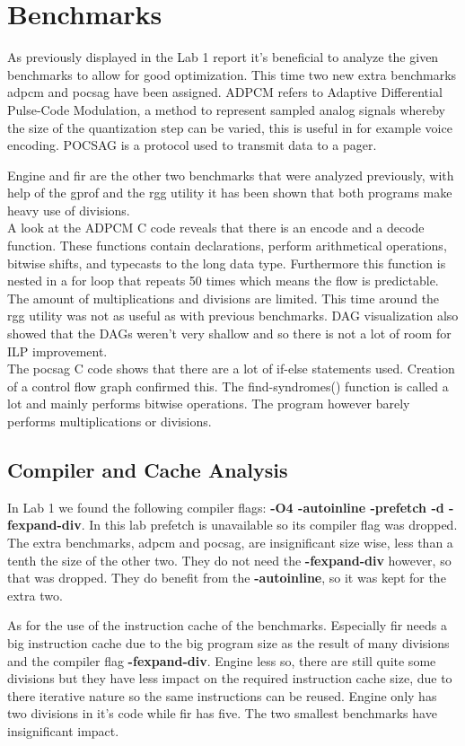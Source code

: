\section{Benchmarks}
\label{sec:benchmarks}
As previously displayed in the Lab 1 report it's beneficial to analyze the given benchmarks to allow for good optimization.
This time two new extra benchmarks adpcm and pocsag have been assigned.
ADPCM refers to Adaptive Differential Pulse-Code Modulation, a method to represent sampled analog signals whereby the size of the quantization step can be varied, this is useful in for example voice encoding.
POCSAG is a protocol used to transmit data to a pager.


Engine and fir are the other two benchmarks that were analyzed previously, with help of the gprof and the rgg utility it has been shown that both programs make heavy use of divisions.\\
A look at the ADPCM C code reveals that there is an encode and a decode function. 
These functions contain declarations, perform arithmetical operations, bitwise shifts, and typecasts to the long data type. 
Furthermore this function is nested in a for loop that repeats 50 times which means the flow is predictable. 
The amount of multiplications and divisions are limited. 
This time around the rgg utility was not as useful as with previous benchmarks. 
DAG visualization also showed that the DAGs weren't very shallow and so there is not a lot of room for ILP improvement.\\
The pocsag C code shows that there are a lot of if-else statements used. 
Creation of a control flow graph confirmed this.
The find-syndromes() function is called a lot and mainly performs bitwise operations. 
The program however barely performs multiplications or divisions.

\subsection{Compiler and Cache Analysis}
\label{ssec:benchmarks-analysis}
In Lab 1 we found the following compiler flags: \textbf{-O4 -autoinline -prefetch -d -fexpand-div}.
In this lab prefetch is unavailable so its compiler flag was dropped.
The extra benchmarks, adpcm and pocsag, are insignificant size wise, less than a tenth the size of the other two.
They do not need the \textbf{-fexpand-div} however, so that was dropped.
They do benefit from the \textbf{-autoinline}, so it was kept for the extra two.

As for the use of the instruction cache of the benchmarks.
Especially fir needs a big instruction cache due to the big program size as the result of many divisions and the compiler flag \textbf{-fexpand-div}.
Engine less so, there are still quite some divisions but they have less impact on the required instruction cache size, due to there iterative nature so the same instructions can be reused.
Engine only has two divisions in it's code while fir has five.
The two smallest benchmarks have insignificant impact.

